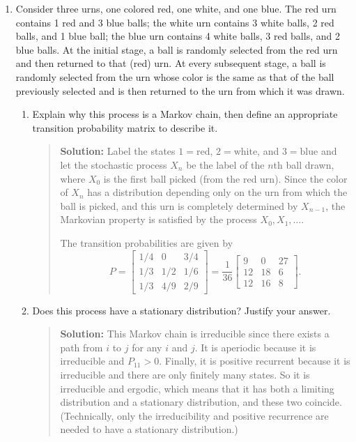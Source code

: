 \documentclass{article}
\begin{document}
\begin{enumerate}
\begin{enumerate}
  \end{enumerate}

  \item Consider three urns, one colored red, one white, and one blue.
  The red urn contains 1 red and 3 blue balls; the white urn contains
  3 white balls, 2 red balls, and 1 blue ball; the blue urn contains
  4 white balls, 3 red balls, and 2 blue balls.  At the initial stage,
  a ball is randomly selected from the red urn and then returned to
  that (red) urn. At every subsequent stage, a ball is randomly selected
  from the urn whose color is the same as that of the ball previously
  selected and is then returned to the urn from which it was drawn. 

  \begin{enumerate}

    \item Explain why this process is a Markov chain, then define an appropriate
    transition probability matrix to describe it.
    \begin{quotation}{\bf Solution:}
    Label the states $1=\mbox{red}$, $2=\mbox{white}$, and $3=\mbox{blue}$
    and let the stochastic process $X_n$ be the label of the $n$th ball drawn, 
    where $X_0$ is the first ball picked (from the red urn).  Since the color of $X_n$
    has a distribution depending only on the urn from which the ball is picked, and
    this urn is completely determined by $X_{n-1}$, the Markovian property is 
    satisfied by the process $X_0, X_1, \ldots$.
    
    The transition probabilities are given by
    \[
    P = 
    \begin{bmatrix}
    1/4 & 0 & 3/4 \\
    1/3 & 1/2 & 1/6 \\
    1/3 & 4/9 & 2/9 
    \end{bmatrix}
    = \frac{1}{36}
    \begin{bmatrix}
    9 & 0 & 27 \\
    12 & 18 & 6 \\
    12 & 16 & 8 
    \end{bmatrix}.
    \]
    \end{quotation}

    \item Does this process have a stationary distribution? Justify your answer.
    \begin{quotation}{\bf Solution:}
    This Markov chain is irreducible since there exists a path from $i$ to $j$ for any $i$ and $j$.
    It is aperiodic because it is irreducible and $P_{11}>0$. Finally, it is positive recurrent because
    it is irreducible and there are only finitely many states.  So it is irreducible and ergodic, which
    means that it has both a limiting distribution and a stationary distribution, and these two
    coincide.  (Technically, only the irreducibility and positive recurrence are needed to
    have a stationary distribution.)
    \end{quotation}


\end{enumerate}
\end{enumerate}
\end{document}
